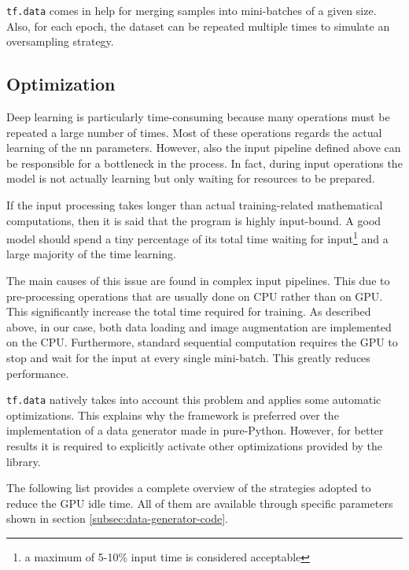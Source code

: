 \texttt{tf.data} comes in help for merging samples into mini-batches of a given size. Also, for each epoch, the dataset can be repeated multiple times to simulate an oversampling strategy.



\subsection{Optimization}

Deep learning is particularly time-consuming because many operations must be repeated a large number of times. Most of these operations regards the actual learning of the \gls{nn} parameters. However, also the input pipeline defined above can be responsible for a bottleneck in the process. In fact, during input operations the model is not actually learning but only waiting for resources to be prepared.

If the input processing takes longer than actual training-related mathematical computations, then it is said that the program is highly input-bound. A good model should spend a tiny percentage of its total time waiting for input\footnote{a maximum of 5-10\% input time is considered acceptable} and a large majority of the time learning.

\medskip

The main causes of this issue are found in complex input pipelines. This due to pre-processing operations that are usually done on CPU rather than on GPU. This significantly increase the total time required for training. As described above, in our case, both data loading and image augmentation are implemented on the CPU. Furthermore, standard sequential computation requires the GPU to stop and wait for the input at every single mini-batch. This greatly reduces performance.

\texttt{tf.data} natively takes into account this problem and applies some automatic optimizations. This explains why the framework is preferred over the implementation of a data generator made in pure-Python. However, for better results it is required to explicitly activate other optimizations provided by the library.

The following list provides a complete overview of the strategies adopted to reduce the GPU idle time. All of them are available through specific parameters shown in section \ref{subsec:data-generator-code}.

